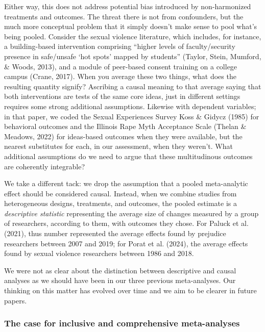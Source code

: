 \documentclass[
  ,jou]{apa6}
\begin{document}
Either way, this does not address potential bias introduced by non-harmonized treatments and outcomes. The threat there is not from confounders, but the much more conceptual problem that it simply doesn't make sense to pool what's being pooled. Consider the sexual violence literature, which includes, for instance, a building-based intervention comprising ``higher levels of faculty/security presence in safe/unsafe `hot spots' mapped by students'' (Taylor, Stein, Mumford, \& Woods, 2013), and a module of peer-based consent training on a college campus (Crane, 2017). When you average these two things, what does the resulting quantity signify? Ascribing a causal meaning to that average \textemdash saying that both interventions are tests of the same core ideas, just in different settings \textemdash requires some strong additional assumptions. Likewise with dependent variables; in that paper, we coded the Sexual Experiences Survey Koss \& Gidycz (1985) for behavioral outcomes and the Illinois Rape Myth Acceptance Scale (Thelan \& Meadows, 2022) for ideas-based outcomes when they were available, but the nearest substitutes for each, in our assessment, when they weren't. What additional assumptions do we need to argue that these multitudinous outcomes are coherently integrable?

We take a different tack: we drop the assumption that a pooled meta-analytic effect should be considered causal. Instead, when we combine studies from heterogeneous designs, treatments, and outcomes, the pooled estimate is a \emph{descriptive statistic} representing the average size of changes measured by a group of researchers, according to them, with outcomes they chose. For Paluck et al. (2021), thus number represented the average effects found by prejudice researchers between 2007 and 2019; for Porat et al. (2024), the average effects found by sexual violence researchers between 1986 and 2018.

We were not as clear about the distinction between descriptive and causal analyses as we should have been in our three previous meta-analyses. Our thinking on this matter has evolved over time and we aim to be clearer in future papers.

\subsubsection{The case for inclusive and comprehensive meta-analyses}\label{the-case-for-inclusive-and-comprehensive-meta-analyses}
\end{document}
